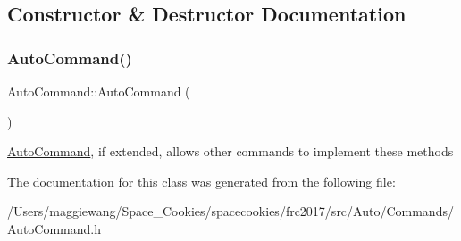 \subsection{Constructor \& Destructor Documentation}
\mbox{\label{class_auto_command_aefc47d2d46e4ea8c74a11b0759f49d98}} 
\subsubsection{\texorpdfstring{Auto\+Command()}{AutoCommand()}}
{\footnotesize\ttfamily Auto\+Command\+::\+Auto\+Command (\begin{DoxyParamCaption}{ }\end{DoxyParamCaption})\hspace{0.3cm}{\ttfamily [inline]}}

\hyperlink{class_auto_command}{Auto\+Command}, if extended, allows other commands to implement these methods 

The documentation for this class was generated from the following file\+:\begin{DoxyCompactItemize}
\item 
/\+Users/maggiewang/\+Space\+\_\+\+Cookies/spacecookies/frc2017/src/\+Auto/\+Commands/Auto\+Command.\+h\end{DoxyCompactItemize}
